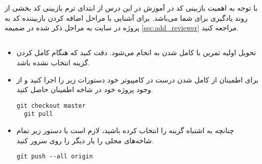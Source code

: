 
\section{}
با توجه به اهمیت بازبینی کد در آموزش در این درس از ابتدای ترم بازبینی کد بخشی از روند یادگیری برای شما می‌باشد. برای آشنایی با مراحل اضافه کردن بازبیننده کد به پروژه
در سایت
به مراحل ذکر شده در ضمیمه
\ref{sec:add_reviewer}
مراجعه کنید.
\subsection{}
\begin{itemize}
	\item
	      تحویل اولیه تمرین با کامل شدن
	      به
	      انجام می‌شود. دقت کنید که هنگام کامل کردن
	      گزینه
	      انتخاب نشده باشد.
	\item
	      برای اطمینان از کامل شدن درست
	      در کامپیوتر خود دستورات زیر را اجرا کنید و از وجود پروژه خود در شاخه
	      اطمینان حاصل کنید.
	      \begin{latin}
		      \begin{lstlisting}[frame=tb,basicstyle={\small\ttfamily},keywordstyle=\color{blue},keywords={checkout, pull}]
  git checkout master
  git pull
			\end{lstlisting}
	      \end{latin}
	\item
	      چنانچه به اشتباه گزینه
	      را انتخاب کرده باشید، لازم است با دستور زیر تمام شاخه‌های محلی را بار دیگر را روی سرور
	      کنید.
	      \begin{latin}
		      \begin{lstlisting}[frame=tb,basicstyle={\small\ttfamily},keywordstyle=\color{blue},keywords={checkout, pull, push, origin}]
  git push --all origin
			\end{lstlisting}
	      \end{latin}
\end{itemize}
